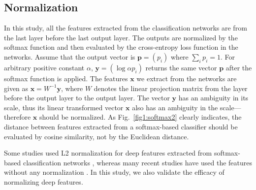 \documentclass[9pt,technote,compsoc]{./sty/IEEEtran}
\newcommand{\Fref}[1]{Fig.~\ref{#1}}
\begin{document}
\subsection{Normalization}
In this study, all the features extracted from the classification networks are from the last layer before the last output layer.
The outputs are normalized by the softmax function and then evaluated by the cross-entropy loss function in the networks.
Assume that the output vector is $\mathbf{p}=\left(p_i\right)$ where $\sum_{i}p_i=1$.
For arbitrary positive constant $\alpha$, $\mathbf{y}=\left(\log{\alpha p_i}\right)$ returns the same vector $\mathbf{p}$ after the softmax function is applied.
The features $\mathbf{x}$ we extract from the networks are given as $\mathbf{x}=W^{-1}\mathbf{y}$, where $W$ denotes the linear projection matrix from the layer before the output layer to the output layer.
The vector $\mathbf{y}$ has an ambiguity in its scale, thus its linear transformed vector $\mathbf{x}$ also has an ambiguity in the scale---therefore $\mathbf{x}$ should be normalized.
As \Fref{fig1:softmax2} clearly indicates, the distance between features extracted from a softmax-based classifier should be evaluated by cosine similarity, not by the Euclidean distance.

Some studies used L2 normalization for deep features extracted from softmax-based classification networks \cite{taigman2014deepface}\cite{babenko2014neural}, whereas many recent studies have used the features without any normalization \cite{krizhevsky2012imagenet}\cite{song2016deep,wei2016dense}.
In this study, we also validate the efficacy of normalizing deep features.
\end{document}
